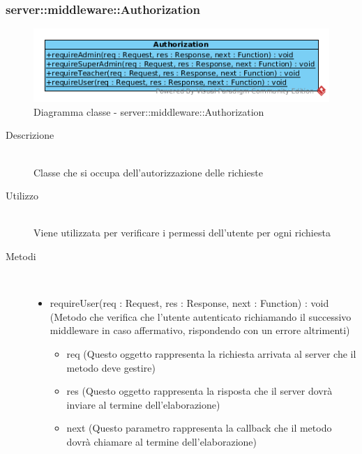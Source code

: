 \vspace{0.5cm}
\hypertarget{server::middleware::Authorization}{}
\subsubsection[Authorization]{server::middleware::Authorization}
\begin{center}
			\begin{figure}[H]
				\centering \includegraphics[scale=4, max width=\textwidth, max height=\myheight]{../img/diagrammiClassi/server/middleware/Authorization.png}
				\caption{Diagramma classe - server::middleware::Authorization}
			\end{figure}
		\end{center}\begin{description}
\item[Descrizione] \hfill \\
 Classe che si occupa dell’autorizzazione delle richieste
\item[Utilizzo] \hfill \\
 Viene utilizzata per verificare i permessi dell'utente per ogni richiesta
\item[Metodi] \hfill \\
 \vspace{-7mm}
\begin{itemize}
\item requireUser(req : Request, res : Response, next : Function) : void (Metodo che verifica che l’utente autenticato richiamando il successivo middleware in caso affermativo, rispondendo con un errore altrimenti)\begin{itemize}
\item req (Questo oggetto rappresenta la richiesta arrivata al server che il metodo deve gestire)
\item res (Questo oggetto rappresenta la risposta che il server dovrà inviare al termine dell'elaborazione)
\item next (Questo parametro rappresenta la callback che il metodo dovrà chiamare al termine dell’elaborazione)
\end{itemize}


\end{itemize}
\end{description}
